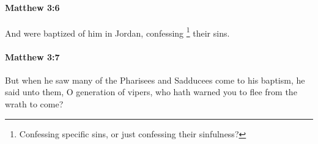 		\paragraph{Matthew 3:6} %
			\label{MATTHEW-3-6}

			And were baptized of him in Jordan, confessing%
				\footnote{%
					Confessing specific sins, or just confessing their sinfulness?
					}
			their sins.

			\begin{framed}
			\scriptsize
				\begin{compactdesc}
					\item[SBLG] 
				\end{compactdesc}
			\end{framed}

		\paragraph{Matthew 3:7} %
			\label{MATTHEW-3-7}

			But when he saw many of the Pharisees and Sadducees come to his baptism, he said unto them, O generation of vipers, who hath warned you to flee from the wrath to come?

